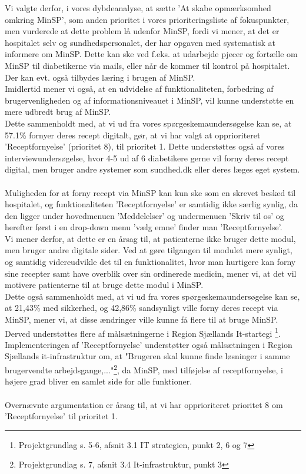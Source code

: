 Vi valgte derfor, i vores dybdeanalyse, at sætte 'At skabe opmærksomhed omkring MinSP', som anden prioritet i vores prioriteringsliste af fokuspunkter, men vurderede at dette problem lå udenfor MinSP, fordi vi mener, at det er hospitalet selv og sundhedspersonalet, der har opgaven med systematisk at informere om MinSP. Dette kan ske ved f.eks. at udarbejde pjecer og fortælle om MinSP til diabetikerne via mails, eller når de kommer til kontrol på hospitalet. Der kan evt. også tilbydes læring i brugen af MinSP.\\
Imidlertid mener vi også, at en udvidelse af funktionaliteten, forbedring af brugervenligheden og af informationsniveauet i MinSP, vil kunne understøtte en mere udbredt brug af MinSP.\\
Dette sammenholdt med, at vi ud fra vores spørgeskemaundersøgelse kan se, at 57.1\% fornyer deres recept digitalt, gør, at vi har valgt at opprioriteret 'Receptfornyelse' (prioritet 8), til prioritet 1. Dette understøttes også af vores interviewundersøgelse, hvor 4-5 ud af 6 diabetikere gerne vil forny deres recept digital, men bruger andre systemer som sundhed.dk eller deres læges eget system.
\\ \\
Muligheden for at forny recept via MinSP kan kun ske som en skrevet besked til hospitalet, og funktionaliteten 'Receptfornyelse' er samtidig ikke særlig synlig, da den ligger under hovedmenuen 'Meddelelser' og undermenuen 'Skriv til os' og herefter først i en drop-down menu 'vælg emne' finder man 'Receptfornyelse'. \\
Vi mener derfor, at dette er en årsag til, at patienterne ikke bruger dette modul, men bruger andre digitale sider. Ved at gøre tilgangen til modulet mere synligt, og samtidig videreudvikle det til en funktionalitet, hvor man hurtigere kan forny sine recepter samt have overblik over sin ordinerede medicin, mener vi, at det vil motivere patienterne til at bruge dette modul i MinSP. \\
Dette også sammenholdt med, at vi ud fra vores spørgeskemaundersøgelse kan se, at 21,43\% med sikkerhed, og 42,86\% sandsynligt ville forny deres recept via MinSP, mener vi, at disse ændringer ville kunne få flere til at bruge MinSP. \\
Derved understøttes flere af målsætningerne i Region Sjællands It-startegi \footnote{Projektgrundlag s. 5-6, afsnit 3.1 IT strategien, punkt 2, 6 og 7}.\\
Implementeringen af 'Receptfornyelse' understøtter også målsætningen i Region Sjællands it-infrastruktur om, at "Brugeren skal kunne finde løsninger i samme brugervendte arbejdsgange,..."\footnote{Projektgrundlag s. 7, afsnit 3.4 It-infrastruktur, punkt 3}, da MinSP, med tilføjelse af receptfornyelse, i højere grad bliver en samlet side for alle funktioner. 
\\ \\
Overnævnte argumentation er årsag til, at vi har opprioriteret prioritet 8 om 'Receptfornyelse' til prioritet 1. 
\newpage
